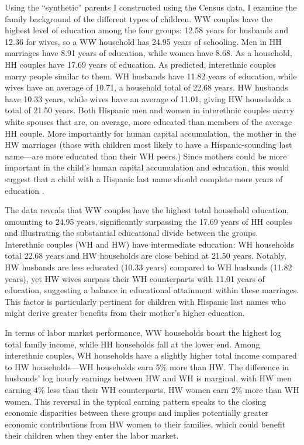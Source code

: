 Using the “synthetic” parents I constructed using the Census data, I examine the family background of the different types of children. WW couples have the highest level of education among the four groups: 12.58 years  for husbands and 12.36 for wives, so a WW household has 24.95 years of schooling. Men in HH marriages have 8.91 years of education, while women have 8.68. As a household, HH couples have 17.69 years of education. As predicted, interethnic couples marry people similar to them. WH husbands have 11.82 years of education, while wives have an average of 10.71, a household total of 22.68 years. HW husbands have 10.33 years, while wives have an average of 11.01, giving HW households a total of 21.50 years. Both  Hispanic men and women in interethnic couples marry white spouses that are, on average, more educated than members of the average HH couple. More importantly for human capital accumulation, the mother in the HW marriages (those with children most likely to have a Hispanic-sounding last name—are more educated than their WH peers.) Since mothers could be more important in the child’s human capital accumulation and education, this would suggest that a child with a Hispanic last name should complete more years of education  \autocite{gould2020does}.

The data reveals that WW couples have the highest total household education, amounting to 24.95 years, significantly surpassing the 17.69 years of HH couples and illustrating the substantial educational divide between the groups. Interethnic couples (WH and HW) have intermediate education: WH households total 22.68 years and HW households are close behind at 21.50 years. Notably, HW husbands are less educated (10.33 years) compared to WH husbands (11.82 years), yet HW wives surpass their WH counterparts with 11.01 years of education, suggesting a balance in educational attainment within these marriages. This factor is particularly pertinent for children with Hispanic last names who might derive greater benefits from their mother’s higher education.

In terms of labor market performance, WW households boast the highest log total family income, while HH households fall at the lower end.  Among interethnic couples, WH households have a slightly higher total income compared to HW households---WH households earn 5\% more than HW. The difference in husbands’ log hourly earnings between HW and WH is marginal, with HW men earning 4\% less than their WH counterparts. HW women earn 2\% more than WH women. This reversal in the typical earning pattern speaks to the closing economic disparities between these groups and implies potentially greater economic contributions from HW women to their families, which could benefit their children when they enter the labor market.

